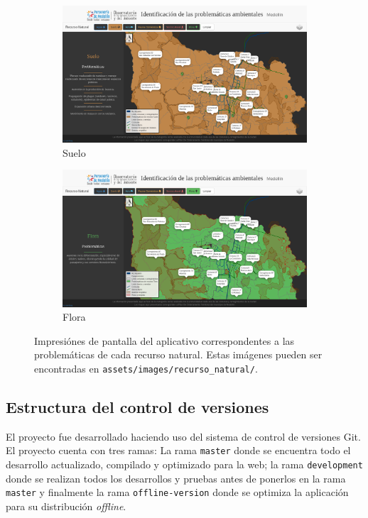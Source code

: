 \documentclass[11pt,letterpaper]{article}
\begin{document}
\begin{figure}[hb!]
\begin{subfigure}{.49\textwidth}
	\includegraphics[width=\textwidth]{../assets/images/recurso_natural/recurso_suelo.png}
	\caption{Suelo}\label{fig:rSuelo}
\end{subfigure}	
\hfill
\begin{subfigure}{.49\textwidth}
	\includegraphics[width=\textwidth]{../assets/images/recurso_natural/recurso_flora.png}
	\caption{Flora}\label{fig:rFlora}
\end{subfigure}
\caption{Impresiónes de pantalla del aplicativo correspondentes a las problemáticas de cada recurso natural. Estas imágenes pueden ser encontradas en {\tt assets/images/recurso\_natural/}.}\label{fig:recurso}
\end{figure}

\subsection{Estructura del control de versiones}
El proyecto fue desarrollado haciendo uso del sistema de control de versiones Git. El proyecto cuenta con tres ramas: La rama {\tt master} donde se encuentra todo el desarrollo actualizado, compilado y optimizado para la web; la rama {\tt development} donde se realizan todos los desarrollos y pruebas antes de ponerlos en la rama {\tt master} y finalmente la rama {\tt offline-version} donde se optimiza la aplicación para su distribución {\it offline}.  
\end{document}
